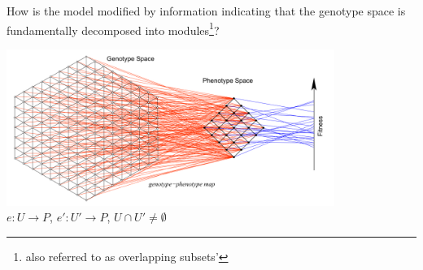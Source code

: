 \begin{frame}
How is the model modified by information indicating that the genotype space is fundamentally decomposed into modules\footnote{also referred to as overlapping subsets'}?
\begin{center}
\includegraphics[width=0.8\textwidth]{fig/gpmap.png}\\
$e \colon U \longrightarrow P$, $e' \colon U' \longrightarrow P$, $U \cap U' \neq \emptyset$
\end{center}
\end{frame}
